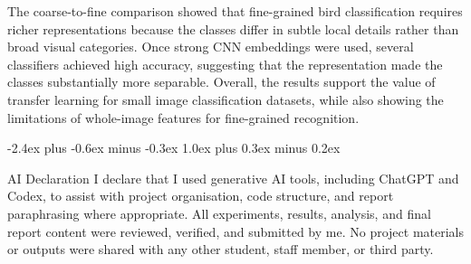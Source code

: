 \documentclass[11pt]{article}
\makeatletter
\renewcommand\section{%
    \@startsection{section}{1}{\z@}%
                  {-2.4ex plus -0.6ex minus -0.3ex}%
                  {1.0ex plus 0.3ex minus 0.2ex}%
                  {\large\bf\raggedright}}
\makeatother
\begin{document}
The coarse-to-fine comparison showed that fine-grained bird classification requires richer representations 
because the classes differ in subtle local details rather than broad visual categories. 
Once strong CNN embeddings were used, several classifiers achieved high accuracy, suggesting 
that the representation made the classes substantially more separable. Overall, the results 
support the value of transfer learning for small image classification datasets, while also 
showing the limitations of whole-image features for fine-grained recognition.

\section{AI Declaration}
I declare that I used generative AI tools, including ChatGPT and Codex, 
to assist with project organisation, code structure, and report paraphrasing where appropriate. 
All experiments, results, analysis, and final report content were reviewed, verified, 
and submitted by me. No project materials or outputs were shared with any other student, staff member, or third party.



\end{document}
